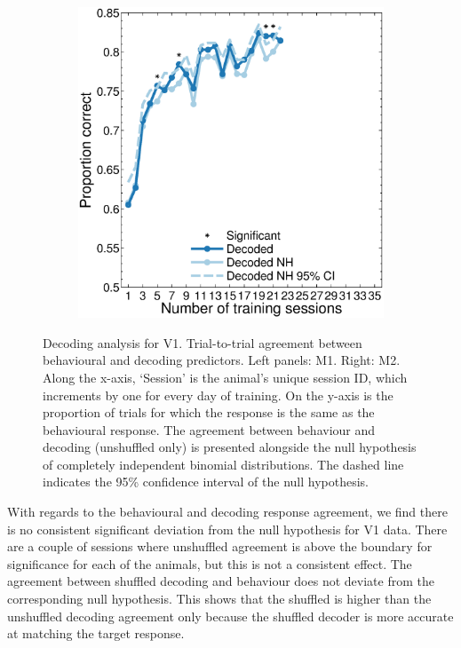 \begin{figure}[htbp]
\begin{subfigure}[b]{0.5\linewidth}
	\includegraphics[width=\linewidth]{figs/decoding/agree_v1_jack.eps}
    \end{subfigure}
    \caption{%
    Decoding analysis for \ac{V1}.
    Trial-to-trial agreement between behavioural and decoding predictors.
    Left panels: \ac{M1}. Right: \ac{M2}.
	Along the x-axis, `Session' is the animal's unique session ID, which increments by one for every day of training.
    On the y-axis is the proportion of trials for which the response is the same as the behavioural response.
    The agreement between behaviour and decoding (unshuffled only) is presented alongside the null hypothesis of completely independent binomial distributions.
    The dashed line indicates the 95\% confidence interval of the null hypothesis.
}
    \label{fig:decag_all_v1}
\end{figure}


With regards to the behavioural and decoding response agreement, we find there is no consistent significant deviation from the null hypothesis for \ac{V1} data.
There are a couple of sessions where unshuffled agreement is above the boundary for significance for each of the animals, but this is not a consistent effect.
The agreement between shuffled decoding and behaviour does not deviate from the corresponding null hypothesis.
This shows that the shuffled is higher than the unshuffled decoding agreement only because the shuffled decoder is more accurate at matching the target response.

